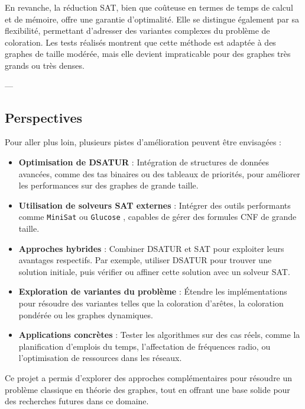 \documentclass[11pt]{article}
\begin{document}
En revanche, la réduction SAT, bien que coûteuse en termes de temps de calcul et de mémoire, offre une garantie d'optimalité. Elle se distingue également par sa flexibilité, permettant d'adresser des variantes complexes du problème de coloration. Les tests réalisés montrent que cette méthode est adaptée à des graphes de taille modérée, mais elle devient impraticable pour des graphes très grands ou très denses.

---

\subsection{Perspectives}

Pour aller plus loin, plusieurs pistes d'amélioration peuvent être envisagées :
\begin{itemize}
    \item \textbf{Optimisation de DSATUR} : Intégration de structures de données avancées, comme des tas binaires ou des tableaux de priorités, pour améliorer les performances sur des graphes de grande taille.
    \item \textbf{Utilisation de solveurs SAT externes} : Intégrer des outils performants comme \texttt{MiniSat} ou \texttt{Glucose} \cite{sat_glucose} , capables de gérer des formules CNF de grande taille.
    \item \textbf{Approches hybrides} : Combiner DSATUR et SAT pour exploiter leurs avantages respectifs. Par exemple, utiliser DSATUR pour trouver une solution initiale, puis vérifier ou affiner cette solution avec un solveur SAT.
    \item \textbf{Exploration de variantes du problème} : Étendre les implémentations pour résoudre des variantes telles que la coloration d'arêtes, la coloration pondérée ou les graphes dynamiques.
    \item \textbf{Applications concrètes} : Tester les algorithmes sur des cas réels, comme la planification d'emplois du temps, l'affectation de fréquences radio, ou l'optimisation de ressources dans les réseaux.
\end{itemize}

Ce projet a permis d'explorer des approches complémentaires pour résoudre un problème classique en théorie des graphes, tout en offrant une base solide pour des recherches futures dans ce domaine.
\end{document}
